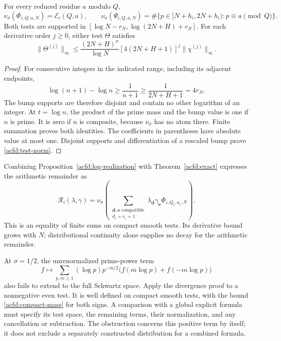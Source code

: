 \begin{proposition}
For\label{acfd:log-realization} every reduced residue $a$ modulo $Q$,
\[
 \nu_\sigma(\Phi_{i,Q,a,N})=\mathcal E_i(Q,a),\qquad
 \nu_\sigma(\Psi_{i,Q,a,N})
    =\#\{p\in[N+h_i,2N+h_i):p\equiv a\pmod Q\}.
\]
Both tests are supported in
$[\log N-r_N,\log(2N+H)+r_N]$.
For each derivative order $j\geq0$, either test $\Theta$ satisfies
\begin{equation}\label{acfd:test-norm}
 \|\Theta^{(j)}\|_\infty
    \leq\frac{(2N+H)^\sigma}{\log N}
          [4(2N+H+1)]^j\|\chi^{(j)}\|_\infty.
\end{equation}
\end{proposition}

\begin{proof}
For consecutive integers in the indicated range, including its adjacent endpoints,
\[
 \log(n+1)-\log n\geq\frac1{n+1}\geq\frac1{2N+H+1}=4r_N.
\]
The bump supports are therefore disjoint and contain no other logarithm of an integer.
At $t=\log n$, the product of the prime mass and the bump value is one
if $n$ is prime.  It is zero if $n$ is composite, because $\nu_\sigma$
has no atom there.  Finite summation proves both identities.
The coefficients in parentheses have absolute value at most one.
Disjoint supports and differentiation of a rescaled bump prove
\eqref{acfd:test-norm}.
\end{proof}

Combining Proposition~\ref{acfd:log-realization} with
Theorem~\ref{acfd:exact} expresses the arithmetic remainder as
\[
 \mathcal R_i(\lambda,\gamma)
   =\nu_\sigma\!\left(
      \sum_{\substack{\boldsymbol d,\boldsymbol e\text{ compatible}\\d_i=e_i=1}}
         \lambda_{\boldsymbol d}\gamma_{\boldsymbol e}
         \Phi_{i,Q_i,a_i,N}\right).
\]
This is an equality of finite sums on compact smooth tests.
Its derivative bound grows with $N$; distributional continuity alone supplies
no decay for the arithmetic remainder.

At $\sigma=1/2$, the unrenormalized prime-power term
\[
 f\longmapsto\sum_{p,m\geq1}(\log p)p^{-m/2}
                       \bigl(f(m\log p)+f(-m\log p)\bigr)
\]
also fails to extend to the full Schwartz space.
Apply the divergence proof to a nonnegative even test.
It is well defined on compact smooth tests, with the bound
\eqref{acfd:compact-mass} for both signs.
A comparison with a global explicit formula must specify its test space,
the remaining terms, their normalization, and any cancellation or subtraction.
The obstruction concerns this positive term by itself; it does not exclude
a separately constructed distribution for a combined formula.

